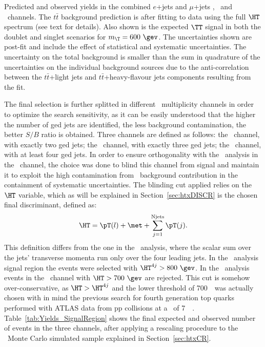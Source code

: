 \begin{table}[tb]\centering

\caption{Predicted and observed yields in the combined 
$e$+jets and $\mu$+jets \chii, \chiii\ and \chiv\ channels. 
The $t\bar{t}$ background prediction is after fitting to data 
using the full $\HT$ spectrum (see text for details).
Also shown is the expected $\TT$ signal in both the doublet 
and singlet scenarios for $m_{\T}=600~\gev$. 
The uncertainties shown 
are post-fit and include the effect of 
statistical and systematic uncertainties. 
The uncertainty on the total background is smaller 
than the sum in quadrature of the uncertainties on the individual background
sources due to the anti-correlation between the $t\bar{t}$+light 
jets and $t\bar{t}$+heavy-flavour jets components resulting from 
the fit.\label{tab:Yields_SignalRegion}}
\end{table}

The final selection is further splitted in different \bjet\ multiplicity 
channels in order to optimize the search sensitivity, as it can be
easily understood that the higher the number of \btag ged jets are
identified, the less background contamination, 
the better $S/B$ ratio is obtained. Three channels are
defined as follows: the \chii\ channel, with exactly two \btag ged jets;
the \chiii\ channel, with exactly three \btag ged jets;
the \chiv\ channel, with at least four \btag ged jets.
In order to ensure orthogonality with the \wbx\ analysis
in the \chii\ channel, the choice was done to blind this channel
from signal and maintain it to exploit the high contamination from
\ttbar\ background contribution in the containment of systematic
uncertainties. The blinding cut applied relies on the $\HT$ variable,
which as will be explained in Section~\ref{sec:htxDISCR} is the 
chosen final discriminant, defined as:
\begin{equation}\label{eq:htxHT}
\HT = \pT(l) + \met + \sum_{j = 1}^{\rm N jets}\pT(j). 
\end{equation}
This definition differs from the one in the \wbx\ analysis,
where the scalar sum over the jets' transverse momenta run only
over the four leading jets. In the \wbx\ analysis signal region the 
events were selected with $\HT^{4j} > 800~\gev$. In the \htx\ 
analysis events in the \chii\ channel with $\HT > 700~\gev$
are rejected. This cut is somehow over-conservative, as $\HT>\HT^{4j}$
and the lower threshold of 700~\gev\ was actually chosen with in mind
the previous search for fourth generation top quarks performed with
ATLAS data from pp collisions at a \cme\ of 7~\tev~\cite{ATLAS:2012qe}.
Table~\ref{tab:Yields_SignalRegion} shows the final expected and
observed number of events in the three channels, after applying a rescaling
procedure to the \ttbar\ Monte Carlo simulated sample explained in
Section~\ref{sec:htxCR}.


